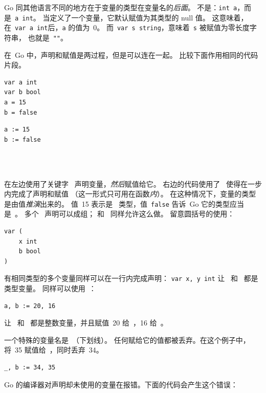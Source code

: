 Go 同其他语言不同的地方在于变量的类型在变量名的\emph{后面}。
不是：\lstinline{int a}，而是~\lstinline{a int}。
当定义了一个变量，它默认赋值为其类型的 null 值。
这意味着，在~\lstinline{var a int}后，\lstinline{a} 的值为~0。
而~\lstinline{var s string}，意味着~\lstinline{s} 被赋值为零长度字符串，
也就是~\lstinline{""}。

在~Go 中，声明和赋值是两过程，但是可以连在一起。
比较下面作用相同的代码片段。

\begin{minipage}{.5\textwidth}
\begin{lstlisting}[linewidth=.5\textwidth,caption={用 = 声明}]
var a int
var b bool
a = 15
b = false
\end{lstlisting}
\hfill
\end{minipage}
\begin{minipage}{.5\textwidth}
\begin{lstlisting}[linewidth=.5\textwidth,caption={用 := 声明}]
a := 15
b := false
\end{lstlisting}
\ \\
\ \\
\hfill
\end{minipage}

在左边使用了关键字~ 声明变量，\emph{然后}赋值给它。
右边的代码使用了~\mbox{\key{:=}{ }} 使得在一步内完成了声明和赋值
（这一形式只可用在函数\emph{内}）。
在这种情况下，变量的类型是由值\emph{推演}出来的。
值~15 表示是~ 类型，值~\texttt{false} 告诉~Go 它的类型应当是~。
多个~ 声明可以成组； 和~ 同样允许这么做。
留意圆括号的使用：
\begin{lstlisting}
var (
    x int
    b bool
)
\end{lstlisting}
有相同类型的多个变量同样可以在一行内完成声明：
\lstinline{var x, y int} 让~ 和~ 都是~ 类型变量。
同样可以使用~：
\begin{lstlisting}
a, b := 20, 16
\end{lstlisting}
让~ 和~ 都是整数变量，并且赋值~20 给~，16 给~。

一个特殊的变量名是~\var{\textbf{\_}}（下划线）。
任何赋给它的值都被丢弃。在这个例子中，将~35 赋值给~，同时丢弃~34。
\begin{lstlisting}
_, b := 34, 35
\end{lstlisting}
Go 的编译器对声明却未使用的变量在报错。下面的代码会产生这个错误：

